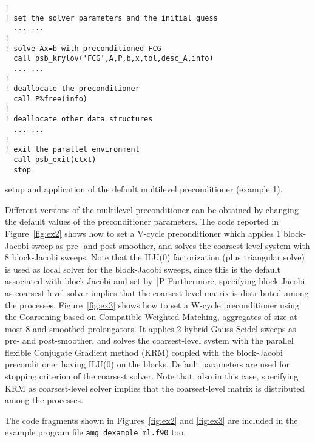 \begin{listing}[tbp]
\begin{center}
\begin{minipage}{.90\textwidth}
{\begin{verbatim}
!
! set the solver parameters and the initial guess
  ... ...
!
! solve Ax=b with preconditioned FCG
  call psb_krylov('FCG',A,P,b,x,tol,desc_A,info)
  ... ...
!
! deallocate the preconditioner
  call P%free(info)
!
! deallocate other data structures
  ... ...
!
! exit the parallel environment
  call psb_exit(ctxt)
  stop
\end{verbatim}
}
\fi
\end{minipage}
\caption{setup and application of the default multilevel preconditioner (example 1).
\label{fig:ex1}}
\end{center}
\end{listing}

Different versions of the multilevel preconditioner can be obtained by changing
the default values of the preconditioner parameters. The code reported in
Figure~\ref{fig:ex2} shows how to set a V-cycle preconditioner
which applies 1 block-Jacobi sweep as pre- and post-smoother,
and solves the coarsest-level system with 8 block-Jacobi sweeps.
Note that the ILU(0) factorization (plus triangular solve) is used as
local solver for the block-Jacobi sweeps, since this is the default associated
with block-Jacobi and set by~\fortinline|P%
Furthermore, specifying block-Jacobi as coarsest-level
solver implies that the coarsest-level matrix is distributed
among the processes.
Figure~\ref{fig:ex3} shows how to set a W-cycle preconditioner using the Coarsening based on Compatible Weighted Matching, aggregates of size at most $8$ and smoothed prolongators. It applies
2 hybrid Gauss-Seidel sweeps as pre- and post-smoother,
and solves the coarsest-level system with the parallel flexible Conjugate Gradient method (KRM) coupled with the block-Jacobi preconditioner having ILU(0) on the blocks. Default parameters are used for stopping criterion of the coarsest solver.
Note that, also in this case, specifying KRM as coarsest-level
solver implies that the coarsest-level matrix is distributed
among the processes.



The code fragments shown in Figures~\ref{fig:ex2} and \ref{fig:ex3} are
included in the example program file \verb|amg_dexample_ml.f90| too.

